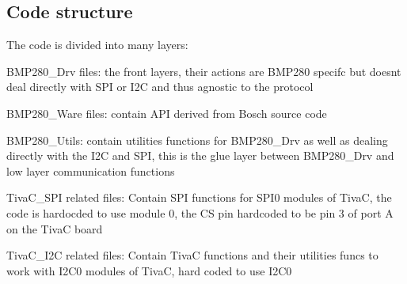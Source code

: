 \subsection*{Code structure}

The code is divided into many layers\+:


\begin{DoxyItemize}
\item B\+M\+P280\+\_\+\+Drv files\+: the front layers, their actions are B\+M\+P280 specifc but doesn\textquotesingle{}t deal directly with S\+PI or I2C and thus agnostic to the protocol
\item B\+M\+P280\+\_\+\+Ware files\+: contain A\+PI derived from Bosch source code
\item B\+M\+P280\+\_\+\+Utils\+: contain utilities functions for B\+M\+P280\+\_\+\+Drv as well as dealing directly with the I2C and S\+PI, this is the glue layer between B\+M\+P280\+\_\+\+Drv and low layer communication functions
\item Tiva\+C\+\_\+\+S\+PI related files\+: Contain S\+PI functions for S\+P\+I0 modules of TivaC, the code is hardocded to use module 0, the CS pin hardcoded to be pin 3 of port A on the TivaC board
\item Tiva\+C\+\_\+\+I2C related files\+: Contain TivaC functions and their utilities funcs to work with I2\+C0 modules of TivaC, hard coded to use I2\+C0 
\end{DoxyItemize}